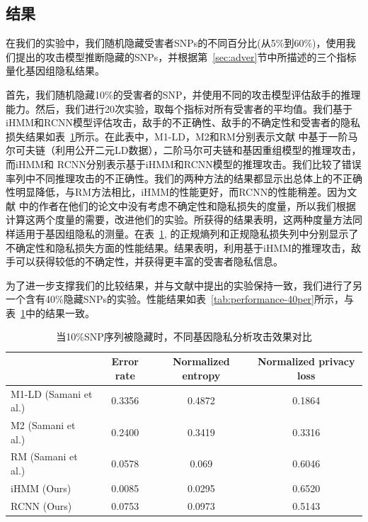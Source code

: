 \subsection{结果}

在我们的实验中，我们随机隐藏受害者SNPs的不同百分比(从5\%到60\%)，使用我们提出的攻击模型推断隐藏的SNPs，并根据第~\ref{sec:adver}节中所描述的三个指标量化基因组隐私结果。

首先，我们随机隐藏10\%的受害者的SNP，并使用不同的攻击模型评估敌手的推理能力。然后，我们进行20次实验，取每个指标对所有受害者的平均值。我们基于iHMM和RCNN模型评估攻击，敌手的不正确性、敌手的不确定性和受害者的隐私损失结果如表~\ref{tab:performance-10per}所示。在此表中，M1-LD，M2和RM分别表示文献 \cite{samani2015quantifying} 中基于一阶马尔可夫链（利用公开二元LD数据），二阶马尔可夫链和基因重组模型的推理攻击，而iHMM和 RCNN分别表示基于iHMM和RCNN模型的推理攻击。我们比较了错误率列中不同推理攻击的不正确性。我们的两种方法的结果都显示出总体上的不正确性明显降低，与RM方法相比，iHMM的性能更好，而RCNN的性能稍差。因为文献\cite{samani2015quantifying} 中的作者在他们的论文中没有考虑不确定性和隐私损失的度量，所以我们根据计算这两个度量的需要，改进他们的实验。所获得的结果表明，这两种度量方法同样适用于基因组隐私的测量。在表~\ref{tab:performance-10per}, 的正规熵列和正规隐私损失列中分别显示了不确定性和隐私损失方面的性能结果。结果表明，利用基于iHMM的推理攻击，敌手可以获得较低的不确定性，并获得更丰富的受害者隐私信息。

为了进一步支撑我们的比较结果，并与文献\cite{samani2015quantifying}中提出的实验保持一致，我们进行了另一个含有40\%隐藏SNPs的实验。性能结果如表~\ref{tab:performance-40per}所示，与表~\ref{tab:performance-10per}中的结果一致。

\begin{table}
	\caption{当10\%SNP序列被隐藏时，不同基因隐私分析攻击效果对比}
	\label{tab:performance-10per}
	\begin{tabular}{lccc}
		\hline
		& Error rate & Normalized entropy & Normalized privacy loss\\
		\hline
		M1-LD (Samani et al.) & 0.3356  & 0.4872 & 0.1864 \\
		M2 (Samani et al.)    & 0.2400  & 0.3419 & 0.3316\\
		RM (Samani et al.)    &  0.0578 & 0.069 & 0.6046 \\
		iHMM (Ours)          & 0.0085  &0.0295 & 0.6520 \\
		RCNN (Ours)          & 0.0753  &0.0973 & 0.5143\\
		\hline
	\end{tabular}
\end{table}


